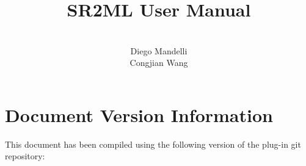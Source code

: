 \documentclass[pdf,12pt]{INLreport}
\title{SR2ML User Manual}
\author{
\\Diego Mandelli
\\Congjian Wang
}
\date{}
\begin{document}
    \sloppy
    \maketitle

    \cleardoublepage		%
    \tableofcontents
    \SANDmain

    
    
    
    
    
    
    
    
    
    
    
    
    
    

    \section*{Document Version Information}
    This document has been compiled using the following version of the plug-in git repository:
    \newline
    

    \clearpage
    \providecommand*{\phantomsection}{}
    \phantomsection
    
    


\end{document}
